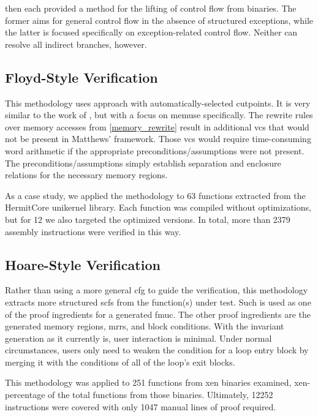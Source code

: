  then each provided a method for the lifting of control flow from binaries.
The former aims for general control flow in the absence of structured exceptions, while the latter is focused specifically on exception-related control flow.
Neither can resolve all indirect branches, however.

\subsection{Floyd-Style Verification}
This methodology uses  approach \autocite{floyd1967assigning}
with automatically-selected cutpoints.
It is very similar to the work of \textcite{matthews2006verification},
but with a focus on \gls{memuse} specifically.
The rewrite rules over memory accesses from \cref{memory_rewrite}
result in additional \glspl{vc} that would not be present in Matthews' framework.
Those \glspl{vc} would require time-consuming word arithmetic if the appropriate preconditions/assumptions were not present.
The preconditions/assumptions simply establish separation and enclosure relations for the necessary memory regions.

As a case study, we applied the methodology to \num{63} functions extracted from the HermitCore unikernel library.
Each function was compiled without optimizations, but for \num{12} we also targeted the optimized versions.
In total, more than \num{2379} assembly instructions were verified in this way.

\subsection{Hoare-Style Verification}
Rather than using a more general \gls{cfg} to guide the verification,
this methodology extracts more structured \glspl{scf} from the function(s) under test.
Such  is used as one of the proof ingredients for a generated \gls{fmuc}.
The other proof ingredients are the generated memory regions, \glspl{mrr}, and block conditions.
With the invariant generation as it currently is, user interaction is minimal.
Under normal circumstances, users only need to weaken the condition for a loop entry block by merging it with the conditions of all of the loop's exit blocks.

This methodology was applied to \num{251} functions from \gls{xen} binaries examined, \gls{xen-percentage} of the total functions from those binaries.
Ultimately, \num{12252} instructions were covered with only \num{1047} manual lines of proof required.

